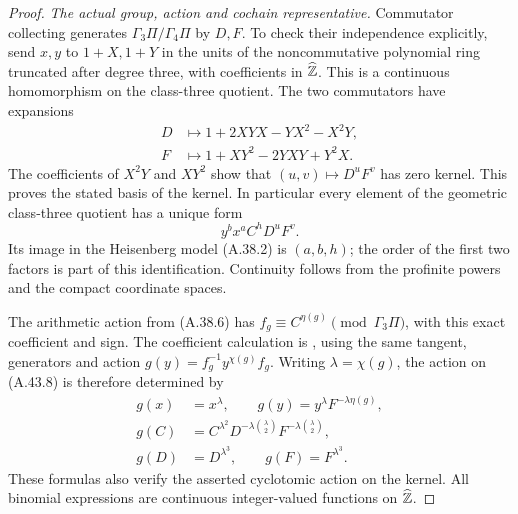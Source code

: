 \begin{proof}
\emph{The actual group, action and cochain representative.}
Commutator collecting generates $\Gamma_3\Pi/\Gamma_4\Pi$
by $D,F$.  To check their independence explicitly, send $x,y$
to $1+X,1+Y$ in the units of the noncommutative polynomial ring
truncated after degree three, with coefficients in
$\widehat{\mathbb Z}$.  This is a continuous homomorphism on the
class-three quotient.  The two commutators have expansions
\[
 \begin{split}
 D&\longmapsto 1+2XYX-YX^2-X^2Y,\\
 F&\longmapsto 1+XY^2-2YXY+Y^2X.
 \end{split}
 \tag{A.43.7}
\]
The coefficients of $X^2Y$ and $XY^2$ show that
$(u,v)\mapsto D^uF^v$ has zero kernel.  This proves the stated
basis of the kernel.  In particular every element of the geometric
class-three quotient has a unique form
\[
                         y^b x^a C^h D^uF^v.
 \tag{A.43.8}
\]
Its image in the Heisenberg model (A.38.2) is $(a,b,h)$;
the order of the first two factors is part of this identification.
Continuity follows from the profinite powers and the compact
coordinate spaces.

The arithmetic action from (A.38.6) has
$f_g\equiv C^{\eta(g)}\pmod{\Gamma_3\Pi}$, with this exact
coefficient and sign.  The coefficient calculation is
\cite[\S12.5.2, equation (12.35)]{BIR_Wickelgren2012}, using
the same tangent, generators and action
$g(y)=f_g^{-1}y^{\chi(g)}f_g$.
Writing $\lambda=\chi(g)$, the action on (A.43.8) is therefore
determined by
\[
 \begin{split}
 g(x)&=x^\lambda,\qquad
 g(y)=y^\lambda F^{-\lambda\eta(g)},\\
 g(C)&=C^{\lambda^2}
       D^{-\lambda\binom\lambda2}
       F^{-\lambda\binom\lambda2},\\
 g(D)&=D^{\lambda^3},\qquad g(F)=F^{\lambda^3}.
 \end{split}
 \tag{A.43.9}
\]
These formulas also verify the asserted cyclotomic action on
the kernel.  All binomial expressions are continuous
integer-valued functions on $\widehat{\mathbb Z}$.


\end{proof}
